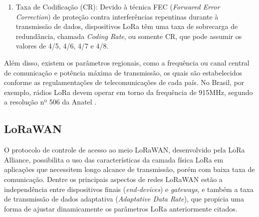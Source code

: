 \documentclass[oneside,openright,12pt]{ufsm_2015} %
\begin{document}
\begin{enumerate}
\begin{figure}[ht]
    \end{figure}
    
    \item Taxa de Codificação (CR): Devido à técnica FEC (\textit{Forwared Error Correction}) de proteção contra interferências repentinas durante à transmissão de dados, dispositivos LoRa têm uma taxa de sobrecarga de redundância, chamada \textit{Coding Rate}, ou somente CR, que pode assumir os valores de 4/5, 4/6, 4/7 e 4/8.
\end{enumerate}

Além disso, existem os parâmetros regionais, como a frequência ou canal central de comunicação e potência máxima de transmissão, os quais são estabelecidos conforme as regulamentações de telecomunicações de cada país. No Brasil, por exemplo, rádios LoRa devem operar em torno da frequência de 915MHz, segundo a resolução nº 506 da Anatel \cite{ttn-frequencies}.

\subsection{LoRaWAN}
O protocolo de controle de acesso ao meio LoRaWAN, desenvolvido pela LoRa Alliance, possibilita o uso das características da camada física LoRa em aplicações que necessitem longo alcance de transmissão, porém com baixa taxa de comunicação. Dentre os principais aspectos de redes LoRaWAN estão a independência entre dispositivos finais (\textit{end-devices}) e \textit{gateways}, e também a taxa de transmissão de dados adaptativa (\textit{Adaptative Data Rate}), que propicia uma forma de ajustar dinamicamente os parâmetros LoRa anteriormente citados.

\end{document}
